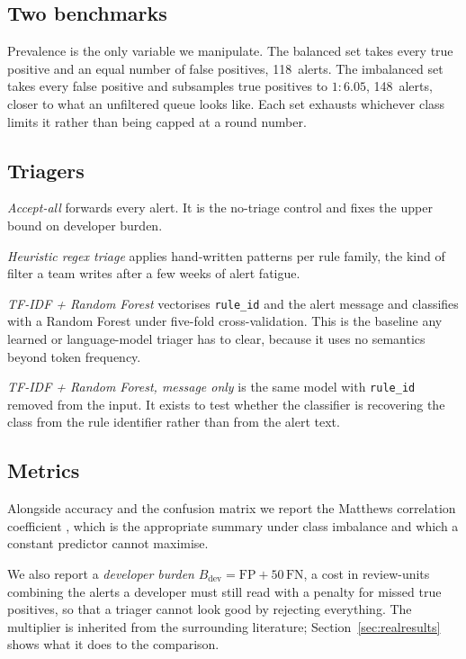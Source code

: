 \documentclass[journal]{IEEEtran}
\providecommand{\citep}[1]{\cite{#1}}
\theoremstyle{definition}
\newcommand{\RNbal}{118}
\newcommand{\RNimb}{148}
\newcommand{\RImbRatio}{6.05}
\begin{document}
\subsection{Two benchmarks}
Prevalence is the only variable we manipulate. The balanced set takes every true
positive and an equal number of false positives, \RNbal\ alerts. The imbalanced
set takes every false positive and subsamples true positives to $1{:}\RImbRatio$,
\RNimb\ alerts, closer to what an unfiltered queue looks like. Each set exhausts
whichever class limits it rather than being capped at a round number.

\subsection{Triagers}
\emph{Accept-all} forwards every alert. It is the no-triage control and fixes
the upper bound on developer burden.

\emph{Heuristic regex triage} applies hand-written patterns per rule family, the
kind of filter a team writes after a few weeks of alert fatigue.

\emph{TF-IDF + Random Forest} vectorises \texttt{rule\_id} and the alert message
and classifies with a Random Forest under five-fold cross-validation. This is
the baseline any learned or language-model triager has to clear, because it uses
no semantics beyond token frequency.

\emph{TF-IDF + Random Forest, message only} is the same model with
\texttt{rule\_id} removed from the input. It exists to test whether the
classifier is recovering the class from the rule identifier rather than from the
alert text.

\subsection{Metrics}
\label{sec:metrics}
Alongside accuracy and the confusion matrix we report the Matthews correlation
coefficient \citep{matthews1975}, which is the appropriate summary under class
imbalance \citep{chicco2020mcc} and which a constant predictor cannot maximise.

We also report a \emph{developer burden}
$B_{\mathrm{dev}} = \mathrm{FP} + 50\,\mathrm{FN}$, a cost in review-units
combining the alerts a developer must still read with a penalty for missed true
positives, so that a triager cannot look good by rejecting everything. The
multiplier is inherited from the surrounding literature;
Section~\ref{sec:realresults} shows what it does to the comparison.
\end{document}
